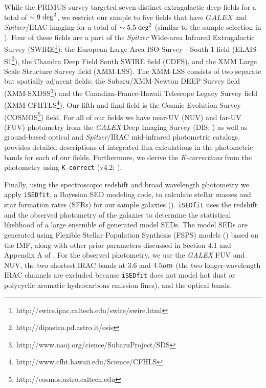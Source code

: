\documentclass{emulateapj}
\begin{document}
While the PRIMUS survey targeted seven distinct extragalactic deep fields for a total of $\sim 9 \; \rm{deg}^2$, we restrict our sample to five fields that have $GALEX$ and {\em Spitzer}/IRAC imaging for a total of $\sim 5.5 \; \rm{deg}^2$ (similar to the sample selection in \citealt{Moustakas:2013aa}). Four of these fields are a part of the {\em Spitzer} Wide-area Infrared Extragalactic Survey (SWIRE\footnote{http://swire.ipac.caltech.edu/swire/swire.html}): the European Large Area ISO Survey - South $1$ field (ELAIS-S1\footnote{http://dipastro.pd.astro.it/esis}), the Chandra Deep Field South SWIRE field (CDFS), and the XMM Large Scale Structure Survey field (XMM-LSS). The XMM-LSS consists of two separate but spatially adjacent fields: the Subaru/XMM-Newton DEEP Survey field (XMM-SXDSS\footnote{http://www.naoj.org/cience/SubaruProject/SDS}) and the Canadian-France-Hawaii Telescope Legacy Survey field (XMM-CFHTLS\footnote{http://www.cfht.hawaii.edu/Science/CFHLS}). Our fifth and final field is the Cosmic Evolution Survey (COSMOS\footnote{http://cosmos.astro.caltech.edu}) field. For all of our fields we have near-UV (NUV) and far-UV (FUV) photometry from the {\em GALEX} Deep Imaging Survey (DIS; \citealt{Martin:2005aa, Morrissey:2005aa}) as well as ground-based optical and {\em Spitzer}/IRAC mid-infrared photometric catalogs. \cite{Moustakas:2013aa} provides detailed descriptions of integrated flux calculations in the photometric bands for each of our fields. Furthermore, we derive the {\em K-corrections} from the photometry using \texttt{K-correct} (v4.2; \citealt{Blanton:2007aa}). 

Finally, using the spectroscopic redshift and broad wavelength photometry we apply \texttt{iSEDfit}, a Bayesian SED modeling code, to calculate stellar masses and star formation rates (SFRs) for our sample galaxies (\citealt{Moustakas:2013aa}). \texttt{iSEDfit} uses the redshift and the observed photometry of the galaxies to determine the statistical likelihood of a large ensemble of generated model SEDs. The model SEDs are generated using Flexible Stellar Population Synthesis (FSPS) models (\citealt{Conroy:2010aa}) based on the \cite{Chabrier:2003aa} IMF, along with other prior parameters discussed in Section 4.1 and Appendix A of \cite{Moustakas:2013aa}. For the observed photometry, we use the {\em GALEX} FUV and NUV, the two shortest IRAC bands at $3.6$ and $4.5 \mu \rm{m}$ (the two longer-wavelength IRAC channels are excluded because \texttt{iSEDfit} does not model hot dust or polycyclic aromatic hydrocarbons emission lines), and the optical bands. 
\end{document}
